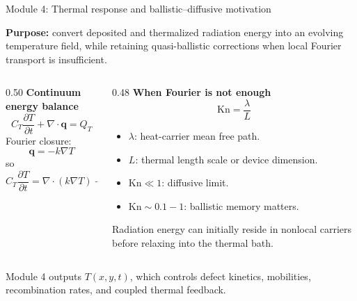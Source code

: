 \documentclass[aspectratio=169,9pt]{beamer}
\newcommand{\grad}{\nabla}
\newcommand{\divg}{\nabla\!\cdot}
\newcommand{\vect}[1]{\bm{#1}}
\begin{document}
\begin{frame}{Module 4: Thermal response and ballistic--diffusive motivation}
\footnotesize
\vspace{-3mm}
\begin{bluebox}
\centering
\textbf{Purpose:} convert deposited and thermalized radiation energy into an evolving temperature field, while retaining quasi-ballistic corrections when local Fourier transport is insufficient.
\end{bluebox}

\vspace{1mm}
\begin{columns}[T,totalwidth=\textwidth]
\begin{column}{0.50\textwidth}
\textbf{Continuum energy balance}
\begin{equation*}
\boxed{C_T\frac{\partial T}{\partial t}+\divg\vect{q}=Q_T}
\end{equation*}
Fourier closure:
\begin{equation*}
\boxed{\vect{q}=-k\grad T}
\end{equation*}
so
\begin{equation*}
\boxed{C_T\frac{\partial T}{\partial t}=\divg(k\grad T)+Q_T.}
\end{equation*}
\end{column}
\begin{column}{0.48\textwidth}
\textbf{When Fourier is not enough}
\begin{equation*}
\boxed{\mathrm{Kn}=\frac{\lambda}{L}}
\end{equation*}
\begin{itemize}\setlength\itemsep{0.35mm}
\item \(\lambda\): heat-carrier mean free path.
\item \(L\): thermal length scale or device dimension.
\item \(\mathrm{Kn}\ll1\): diffusive limit.
\item \(\mathrm{Kn}\sim0.1-1\): ballistic memory matters.
\end{itemize}
\small
Radiation energy can initially reside in nonlocal carriers before relaxing into the thermal bath.
\end{column}
\end{columns}

\vspace{1mm}
\begin{greenbox}
\centering\scriptsize
Module 4 outputs \(T(x,y,t)\), which controls defect kinetics, mobilities, recombination rates, and coupled thermal feedback.
\end{greenbox}
\end{frame}
\end{document}
